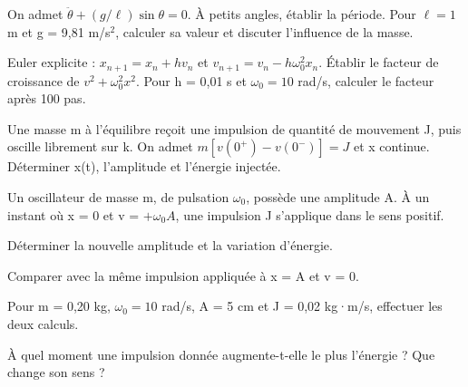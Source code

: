 \begin{questions}
\item On admet $\ddot\theta+(g/\ell)\sin\theta=0$. À petits angles, établir la période. Pour $\ell=1$ m et g = 9,81 m/s$^2$, calculer sa valeur et discuter l’influence de la masse.
\end{questions}

\begin{questions}
\item Euler explicite : $x_{n+1}=x_n+hv_n$ et $v_{n+1}=v_n-h\omega_0^2x_n$. Établir le facteur de croissance de $v^2+\omega_0^2x^2$. Pour h = 0,01 s et $\omega_0=10$ rad/s, calculer le facteur après 100 pas.
\end{questions}

\begin{questions}
\item Une masse m à l’équilibre reçoit une impulsion de quantité de mouvement J, puis oscille librement sur k. On admet $m[v(0^+)-v(0^-)]=J$ et x continue. Déterminer x(t), l’amplitude et l’énergie injectée.
\end{questions}



\label{ch04-ex-D1}
Un oscillateur de masse m, de pulsation $\omega_0$, possède une amplitude A. À un instant où x = 0 et v = $+\omega_0A$, une impulsion J s’applique dans le sens positif.\begin{questions}
\item Déterminer la nouvelle amplitude et la variation d’énergie.
\item Comparer avec la même impulsion appliquée à x = A et v = 0.
\item Pour m = 0,20 kg, $\omega_0=10$ rad/s, A = 5 cm et J = 0,02 kg·m/s, effectuer les deux calculs.
\item À quel moment une impulsion donnée augmente-t-elle le plus l’énergie ? Que change son sens ?
\end{questions}


